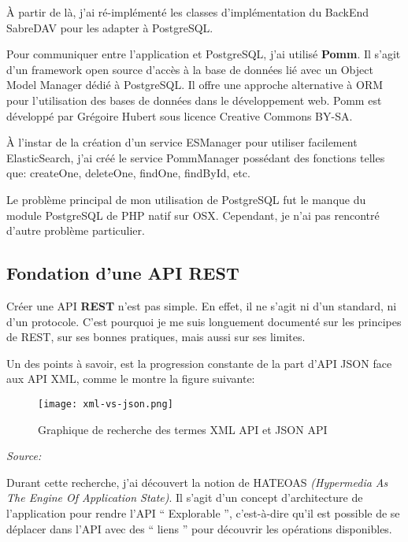 À partir de là, j'ai ré-implémenté les classes d'implémentation du BackEnd SabreDAV pour les adapter à PostgreSQL.

Pour communiquer entre l'application et PostgreSQL, j'ai utilisé \textbf{Pomm}. Il s'agit d'un framework open source d'accès à la base de données lié avec un Object Model Manager dédié à PostgreSQL. Il offre une approche alternative à ORM pour l'utilisation des bases de données dans le développement web. Pomm est développé par Grégoire Hubert sous licence Creative Commons BY-SA.

À l'instar de la création d'un service ESManager pour utiliser facilement ElasticSearch, j'ai créé le service PommManager possédant des fonctions telles que: createOne, deleteOne, findOne, findById, etc.

Le problème principal de mon utilisation de PostgreSQL fut le manque du module PostgreSQL de PHP natif sur OSX. Cependant, je n'ai pas rencontré d'autre problème particulier.

\subsection{Fondation d'une API REST}

Créer une API \textbf{REST} n'est pas simple. En effet, il ne s'agit ni d'un standard, ni d'un protocole. C'est pourquoi je me suis longuement documenté sur les principes de REST, sur ses bonnes pratiques, mais aussi sur ses limites. 

Un des points à savoir, est la progression constante de la part d'API JSON face aux API XML, comme le montre la figure suivante:

\begin{figure}[H]
\begin{center}
\texttt{[image: xml-vs-json.png]}
\end{center}
\caption{Graphique de recherche des termes XML API et JSON API}
\end{figure}

\textit{Source: }

Durant cette recherche, j'ai découvert la notion de HATEOAS \textit{(Hypermedia As The Engine Of Application State)}. Il s'agit d'un concept d'architecture de l'application pour rendre l'API `` Explorable '', c'est-à-dire qu'il est possible de se déplacer dans l'API avec des `` liens '' pour découvrir les opérations disponibles.

